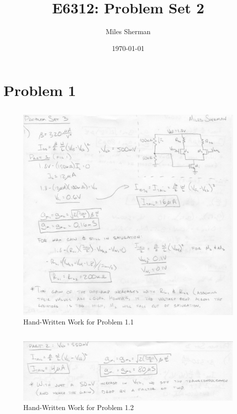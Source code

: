 \documentclass{article}
\begin{document}
\title{E6312: Problem Set 2}
\author{Miles Sherman}
\date{\today}
\maketitle


\section{Problem 1}
\subsection{}
\begin{figure}[H]
\centering
\includegraphics[width=6in]{1_1}
\caption{Hand-Written Work for Problem 1.1}
\label{1_1}
\end{figure}

\subsection{}
\begin{figure}[H]
\centering
\includegraphics[width=6in]{1_2a.pdf}
\caption{Hand-Written Work for Problem 1.2}
\label{1_2}
\end{figure}
\end{document}

